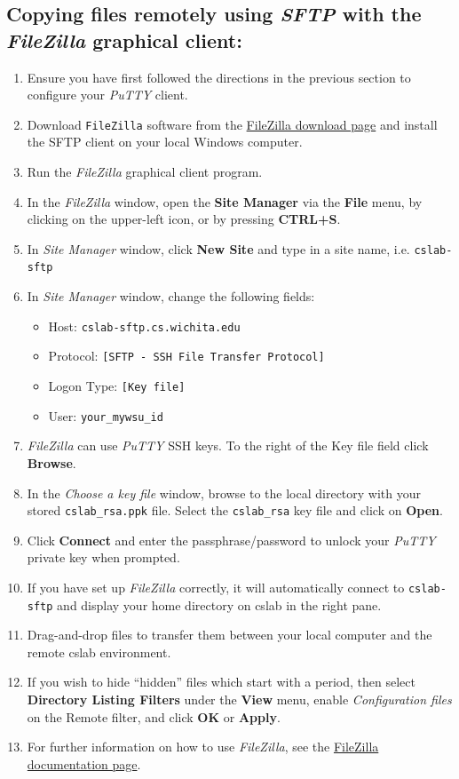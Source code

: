 \documentclass[12pt]{article}
\begin{document}
\begin{flushleft}
\subsection*{Copying files remotely using \textit{SFTP} with the \textit{FileZilla} graphical client:}
\begin{enumerate}
  \item Ensure you have first followed the directions in the previous section to configure your \textit{PuTTY} client.
  \item Download \texttt{FileZilla} software from the \href{https://filezilla-project.org/download.php}{FileZilla download page} and install the SFTP client on your local Windows computer.
  \item Run the \textit{FileZilla} graphical client program.
  \item In the \textit{FileZilla} window, open the \textbf{Site Manager} via the \textbf{File} menu, by clicking on the upper-left icon, or by pressing \textbf{CTRL+S}.
  \item In \textit{Site Manager} window, click \textbf{New Site} and type in a site name, i.e. \verb|cslab-sftp|
  \item In \textit{Site Manager} window, change the following fields:
  \begin{itemize}
    \item Host: \verb|cslab-sftp.cs.wichita.edu|
    \item Protocol: \verb|[SFTP - SSH File Transfer Protocol]|
    \item Logon Type: \verb|[Key file]|
    \item User: \verb|your_mywsu_id|
  \end{itemize}
  \item \textit{FileZilla} can use \textit{PuTTY} SSH keys. To the right of the Key file field click \textbf{Browse}.
  \item In the \textit{Choose a key file} window, browse to the local directory with your stored \verb|cslab_rsa.ppk| file. Select the \texttt{cslab\_rsa} key file and click on \textbf{Open}.
  \item Click \textbf{Connect} and enter the passphrase/password to unlock your \textit{PuTTY} private key when prompted.
  \item If you have set up \textit{FileZilla} correctly, it will automatically connect to \verb|cslab-sftp| and display your home directory on cslab in the right pane.
  \item Drag-and-drop files to transfer them between your local computer and the remote cslab environment.
  \item If you wish to hide ``hidden'' files which start with a period, then select \textbf{Directory Listing Filters} under the \textbf{View} menu, enable \textit{Configuration files} on the Remote filter, and click \textbf{OK} or \textbf{Apply}.
  \item For further information on how to use \textit{FileZilla}, see the \href{https://wiki.filezilla-project.org/Documentation}{FileZilla documentation page}.
\end{enumerate}


\end{flushleft}
\end{document}
